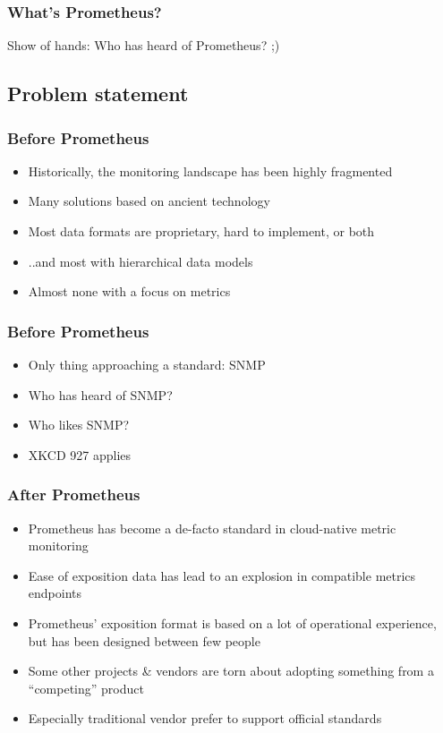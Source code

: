 \documentclass[t]{beamer}
\begin{document}
\begin{frame}
	\frametitle{What's Prometheus?}
		\begin{center}
			\vfill
			Show of hands: Who has heard of Prometheus? ;)
			\vfill
		\end{center}
\end{frame}

\subsection{Problem statement}

\begin{frame}
	\frametitle{Before Prometheus}
	\vfill
	\begin{itemize}
		\item Historically, the monitoring landscape has been highly fragmented
		\item Many solutions based on ancient technology
		\item Most data formats are proprietary, hard to implement, or both
		\item ..and most with hierarchical data models
		\item Almost none with a focus on metrics
	\end{itemize}
	\vfill
\end{frame}

\begin{frame}
	\frametitle{Before Prometheus}
	\vfill
	\begin{itemize}
		\item Only thing approaching a standard: SNMP
		\item Who has heard of SNMP?
		\item Who likes SNMP?
		\item XKCD 927 applies
	\end{itemize}
	\vfill
\end{frame}

\begin{frame}
	\frametitle{After Prometheus}
	\vfill
	\begin{itemize}
		\item Prometheus has become a de-facto standard in cloud-native metric monitoring
		\item Ease of exposition data has lead to an explosion in compatible metrics endpoints
		\item Prometheus’ exposition format is based on a lot of operational experience, but has been designed between few people
		\item Some other projects \& vendors are torn about adopting something from a “competing” product
		\item Especially traditional vendor prefer to support official standards
	\end{itemize}
	\vfill
\end{frame}
\end{document}
